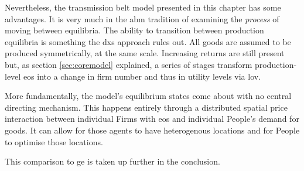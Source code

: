 Nevertheless, the transmission belt model presented in this chapter has some advantages. It is very much in the \gls{abm} tradition of examining the \emph{process} of moving between equilibria. The ability to transition between production equilibria is something the \gls{dxs} approach rules out. All goods are assumed to be produced symmetrically, at the same scale. Increasing returns are still present but, as section \ref{sec:coremodel} explained, a series of stages transform production-level \gls{eos} into a change in firm number and thus in utility levels via \gls{lov}. 

More fundamentally, the model's equilibrium states come about with no central directing mechanism. This happens entirely through a distributed spatial price interaction between individual Firms with \gls{eos} and individual People's demand for goods. It can allow for those agents to have heterogenous locations and for People to optimise those locations. 

This comparison to \gls{ge} is taken up further in the conclusion. 










